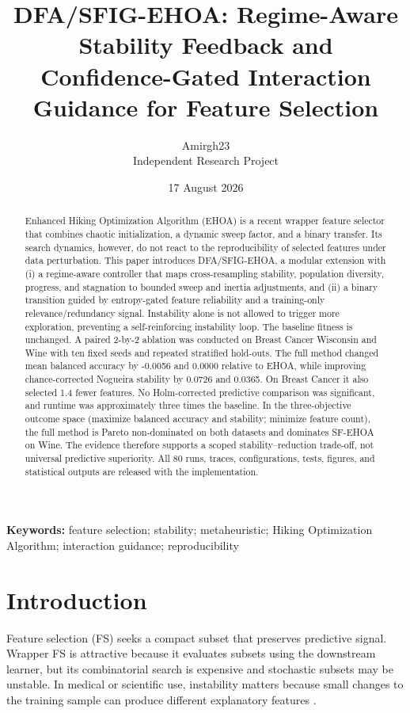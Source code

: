 \documentclass[11pt]{article}
\title{DFA/SFIG-EHOA: Regime-Aware Stability Feedback and\\
Confidence-Gated Interaction Guidance for Feature Selection}
\author{Amirgh23\\Independent Research Project}
\date{17 August 2026}
\begin{document}
\maketitle

\begin{abstract}
Enhanced Hiking Optimization Algorithm (EHOA) is a recent wrapper feature
selector that combines chaotic initialization, a dynamic sweep factor, and a
binary transfer. Its search dynamics, however, do not react to the
reproducibility of selected features under data perturbation. This paper
introduces DFA/SFIG-EHOA, a modular extension with (i) a regime-aware controller
that maps cross-resampling stability, population diversity, progress, and
stagnation to bounded sweep and inertia adjustments, and (ii) a binary
transition guided by entropy-gated feature reliability and a training-only
relevance/redundancy signal. Instability alone is not allowed to trigger more
exploration, preventing a self-reinforcing instability loop. The baseline
fitness is unchanged. A paired 2-by-2 ablation was conducted on Breast Cancer
Wisconsin and Wine with ten fixed seeds and repeated stratified hold-outs. The
full method changed mean balanced accuracy by -0.0056 and 0.0000 relative to
EHOA, while improving chance-corrected Nogueira stability by 0.0726 and 0.0365.
On Breast Cancer it also selected 1.4 fewer features. No Holm-corrected
predictive comparison was significant, and runtime was approximately three
times the baseline. In the three-objective outcome space (maximize balanced
accuracy and stability; minimize feature count), the full method is Pareto
non-dominated on both datasets and dominates SF-EHOA on Wine. The evidence
therefore supports a scoped stability--reduction trade-off, not universal predictive superiority. All 80
runs, traces, configurations, tests, figures, and statistical outputs are
released with the implementation.
\end{abstract}

\noindent\textbf{Keywords:} feature selection; stability; metaheuristic;
Hiking Optimization Algorithm; interaction guidance; reproducibility

\section{Introduction}
Feature selection (FS) seeks a compact subset that preserves predictive signal.
Wrapper FS is attractive because it evaluates subsets using the downstream
learner, but its combinatorial search is expensive and stochastic subsets may
be unstable. In medical or scientific use, instability matters because small
changes to the training sample can produce different explanatory features
\cite{nogueira2018stability}.
\end{document}

